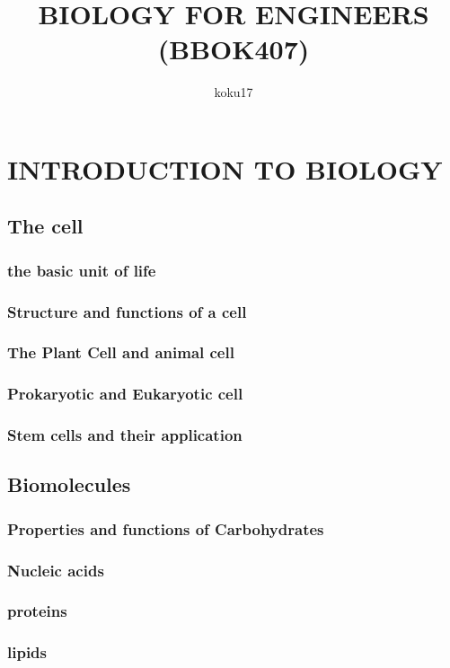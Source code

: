 \documentclass{article}
\author{koku17}
\title{BIOLOGY FOR ENGINEERS (BBOK407)}
\begin{document}
	\maketitle \thispagestyle{empty} \newpage
	\tableofcontents \thispagestyle{empty} \newpage
	\section{INTRODUCTION TO BIOLOGY}
	\subsection{The cell}
	\subsubsection{the basic unit of life}
	\subsubsection{Structure and functions of a cell}
	\subsubsection{The Plant Cell and animal cell}
	\subsubsection{Prokaryotic and Eukaryotic cell}
	\subsubsection{Stem cells and their application}

	\subsection{Biomolecules}
	\subsubsection{Properties and functions of Carbohydrates}
	\subsubsection{Nucleic acids}
	\subsubsection{proteins}
	\subsubsection{lipids}
\end{document}
